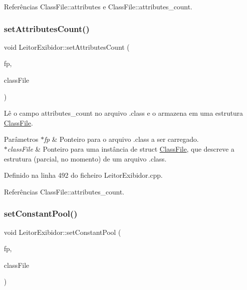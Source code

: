 Referências Class\+File\+::attributes e Class\+File\+::attributes\+\_\+count.

\mbox{\label{classLeitorExibidor_a891dc9f2ceb6f5c337f91a973d2ad6ee}} 
\subsubsection{\texorpdfstring{set\+Attributes\+Count()}{setAttributesCount()}}
{\footnotesize\ttfamily void Leitor\+Exibidor\+::set\+Attributes\+Count (\begin{DoxyParamCaption}\item[{F\+I\+LE $\ast$}]{fp,  }\item[{\hyperlink{classClassFile}{Class\+File} $\ast$}]{class\+File }\end{DoxyParamCaption})\hspace{0.3cm}{\ttfamily [private]}}

Lê o campo attributes\+\_\+count no arquivo .class e o armazena em uma estrutura \hyperlink{classClassFile}{Class\+File}. 
\begin{DoxyParams}{Parâmetros}
{\em $\ast$fp} & Ponteiro para o arquivo .class a ser carregado. \\
\hline
{\em $\ast$class\+File} & Ponteiro para uma instância de struct \hyperlink{classClassFile}{Class\+File}, que descreve a estrutura (parcial, no momento) de um arquivo .class. \\
\hline
\end{DoxyParams}


Definido na linha 492 do ficheiro Leitor\+Exibidor.\+cpp.



Referências Class\+File\+::attributes\+\_\+count.

\mbox{\label{classLeitorExibidor_a34dc148775506753f609e643ac931cac}} 
\subsubsection{\texorpdfstring{set\+Constant\+Pool()}{setConstantPool()}}
{\footnotesize\ttfamily void Leitor\+Exibidor\+::set\+Constant\+Pool (\begin{DoxyParamCaption}\item[{F\+I\+LE $\ast$}]{fp,  }\item[{\hyperlink{classClassFile}{Class\+File} $\ast$}]{class\+File }\end{DoxyParamCaption})\hspace{0.3cm}{\ttfamily [private]}}

